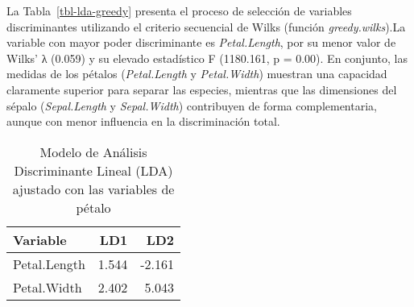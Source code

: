 \documentclass[
  spanish,
  11pt,
  a4paper,
  DIV=11,
  numbers=noendperiod]{scrartcl}
\newenvironment{Shaded}{\begin{snugshade}}{\end{snugshade}}
\newcommand{\AttributeTok}[1]{\textcolor[rgb]{0.40,0.45,0.13}{#1}}
\newcommand{\CommentTok}[1]{\textcolor[rgb]{0.37,0.37,0.37}{#1}}
\newcommand{\DecValTok}[1]{\textcolor[rgb]{0.68,0.00,0.00}{#1}}
\newcommand{\FunctionTok}[1]{\textcolor[rgb]{0.28,0.35,0.67}{#1}}
\newcommand{\NormalTok}[1]{\textcolor[rgb]{0.00,0.23,0.31}{#1}}
\newcommand{\OtherTok}[1]{\textcolor[rgb]{0.00,0.23,0.31}{#1}}
\newcommand{\SpecialCharTok}[1]{\textcolor[rgb]{0.37,0.37,0.37}{#1}}
\newcommand{\StringTok}[1]{\textcolor[rgb]{0.13,0.47,0.30}{#1}}
\begin{document}
La Tabla~\ref{tbl-lda-greedy} presenta el proceso de selección de
variables discriminantes utilizando el criterio secuencial de Wilks
(función \emph{greedy.wilks}).La variable con mayor poder discriminante
es \emph{Petal.Length}, por su menor valor de Wilks' λ (0.059) y su
elevado estadístico F (1180.161, p = 0.00). En conjunto, las medidas de
los pétalos (\emph{Petal.Length} y \emph{Petal.Width}) muestran una
capacidad claramente superior para separar las especies, mientras que
las dimensiones del sépalo (\emph{Sepal.Length} y \emph{Sepal.Width})
contribuyen de forma complementaria, aunque con menor influencia en la
discriminación total.

\begin{Shaded}
\end{Shaded}

\begin{longtable}[]{@{}lrr@{}}

\caption{\label{tbl-lda-modelo}Modelo de Análisis Discriminante Lineal
(LDA) ajustado con las variables de pétalo}

\tabularnewline

\toprule\noalign{}
Variable & LD1 & LD2 \\
\midrule\noalign{}
\endhead
\bottomrule\noalign{}
\endlastfoot
Petal.Length & 1.544 & -2.161 \\
Petal.Width & 2.402 & 5.043 \\

\end{longtable}
\end{document}
